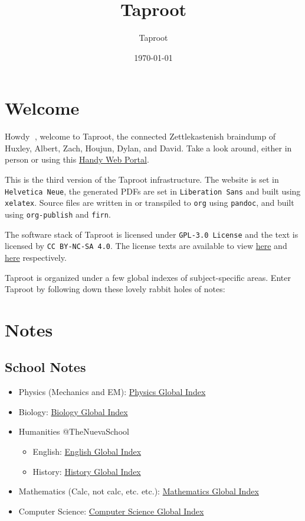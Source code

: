 \documentclass[letterpaper]{article}
\author{Taproot}
\date{\today}
\title{Taproot}
\renewcommand\maketitle{}
\begin{document}
\maketitle

\section{Welcome}
\label{sec:org8c8088e}
Howdy 👋, welcome to Taproot, the connected Zettlekastenish braindump of Huxley, Albert, Zach, Houjun, Dylan, and David. Take a look around, either in person or using this \href{https://taproot3.sanity.gq}{Handy Web Portal}.

This is the third version of the Taproot infrastructure. The website is set in \texttt{Helvetica Neue}, the generated PDFs are set in \texttt{Liberation Sans} and built using \texttt{xelatex}. Source files are written in or transpiled to \texttt{org} using \texttt{pandoc}, and built using \texttt{org-publish} and \texttt{firn}.

The software stack of Taproot is licensed under \texttt{GPL-3.0 License} and the text is licensed by \texttt{CC BY-NC-SA 4.0}. The license texts are available to view \href{https://www.gnu.org/licenses/gpl-3.0.en.html}{here} and \href{https://creativecommons.org/licenses/by-nc-sa/2.0/}{here} respectively.

Taproot is organized under a few global indexes of subject-specific areas. Enter Taproot by following down these lovely rabbit holes of notes:

\section{Notes}
\label{sec:orgb7ee493}

\subsection{School Notes}
\label{sec:org139f613}
\begin{itemize}
\item Physics (Mechanics and EM): \href{physics/index.org}{Physics Global Index}
\item Biology: \href{biology/index.org}{Biology Global Index}
\item Humanities @TheNuevaSchool
\begin{itemize}
\item English: \href{english/index.org}{English Global Index}
\item History: \href{history/index.org}{History Global Index}
\end{itemize}
\item Mathematics (Calc, not calc, etc. etc.): \href{mathematics/index.org}{Mathematics Global Index}
\item Computer Science: \href{cs/index.org}{Computer Science Global Index}
\end{itemize}
\end{document}

